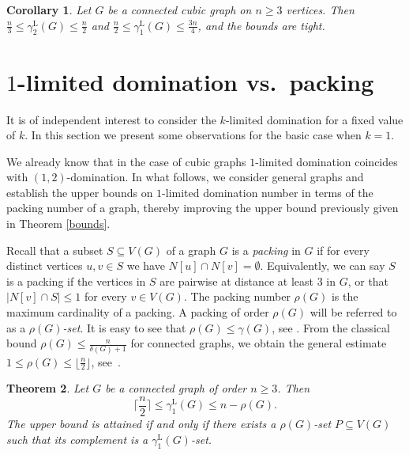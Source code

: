 \documentclass[11pt]{article}
\newtheorem{theorem}{Theorem}
\newtheorem{corollary}[theorem]{Corollary}
\newcommand{\gammaenaL}{\gamma_1^{\mathrm L}}
\begin{document}
\begin{corollary}\label{3-regular}
Let $G$ be a connected cubic graph on $n\geq 3$ vertices. Then $\frac n3 \leq \gamma_2^{\mathrm L}(G)\leq \frac{n}{2}$ and $\frac{n}{2}\leq\gammaenaL(G)\leq \frac{3n}{4}$, and the bounds are tight.
\end{corollary}






\section{$1$-limited domination vs.~packing}
\label{sec:1L}

It is of independent interest to consider the $k$-limited domination for a fixed value of $k$. In this section we present some observations for the basic case when $k=1$. 

We already know that in the case of cubic graphs $1$-limited domination coincides with $(1,2)$-domination. In what follows, we consider general graphs and establish the upper bounds on $1$-limited domination number in terms of the packing number of a graph, thereby improving the upper bound previously given in Theorem \ref{bounds}.

Recall that a subset $S\subseteq V(G)$ of a graph $G$ is a \textit{packing} in $G$ if for every distinct vertices $u,v\in S$ we have $N[u]\cap N[v]=\emptyset$. Equivalently, we can say $S$ is a packing if the vertices in $S$ are
pairwise at distance at least $3$ in $G$, or that $|N[v]\cap S|\leq 1$ for every $v\in V(G)$. The packing number $\rho(G)$ is the maximum cardinality of a packing. A packing of order $\rho(G)$ will be referred to as a \textit{$\rho(G)$-set}. It is easy to see that $\rho(G)\leq \gamma(G)$, see \cite{HHH3}. From the classical bound $\rho(G)\le \frac{n}{\delta(G)+1}$ for connected graphs, we obtain the general estimate $1 \le \rho(G) \le \lfloor \frac{n}{2} \rfloor$, 
see~\cite{klimited}.








\begin{theorem} \label{packing}
Let $G$ be a connected graph of order $n\geq 3$. Then $$\Big\lceil \frac{n}{2} \Big\rceil \leq \gammaenaL(G)\leq n-\rho(G).$$
The upper bound is attained if and only if there exists a $\rho(G)$-set $P\subseteq V(G)$ such that its complement is a $\gammaenaL(G)$-set.
\end{theorem}
\end{document}
